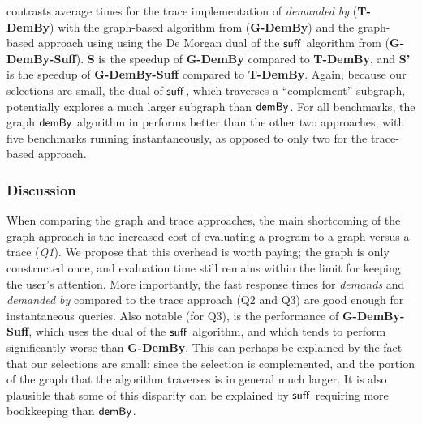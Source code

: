  contrasts average times for the trace implementation of \textit{demanded by}
(\textbf{T-DemBy}) with the graph-based algorithm from 
(\textbf{G-DemBy}) and the graph-based approach using using the De Morgan dual of the $\mathrel{\textup{\textsf{suff}}_{}}$
algorithm from  (\textbf{G-DemBy-Suff}). \textbf{S} is the speedup of
\textbf{G-DemBy} compared to \textbf{T-DemBy}, and \textbf{S'} is the speedup of \textbf{G-DemBy-Suff}
compared to \textbf{T-DemBy}. Again, because our selections are small, the dual of $\mathrel{\textup{\textsf{suff}}_{}}$, which
traverses a ``complement'' subgraph, potentially explores a much larger subgraph than $\mathrel{\textup{\textsf{demBy}}_{}}$. For
all benchmarks, the graph $\mathrel{\textup{\textsf{demBy}}_{}}$ algorithm in  performs
better than the other two approaches, with five benchmarks running instantaneously, as opposed to only two for
the trace-based approach.

{\small}

\subsubsection{Discussion}

When comparing the graph and trace approaches, the main shortcoming of the graph approach is the increased
cost of evaluating a program to a graph versus a trace (\textit{Q1}). We propose that this overhead is worth
paying; the graph is only constructed once, and evaluation time still remains within the limit for keeping the
user's attention. More importantly, the fast response times for \textit{demands} and \textit{demanded by}
compared to the trace approach (Q2 and Q3) are good enough for instantaneous queries. Also notable (for Q3),
is the performance of \textbf{G-DemBy-Suff}, which uses the dual of the $\mathrel{\textup{\textsf{suff}}_{}}$ algorithm, and which
tends to perform significantly worse than \textbf{G-DemBy}. This can perhaps be explained by the fact that our
selections are small: since the selection is complemented, and the portion of the graph that the algorithm
traverses is in general much larger. It is also plausible that some of this disparity can be explained by
$\mathrel{\textup{\textsf{suff}}_{}}$ requiring more bookkeeping than $\mathrel{\textup{\textsf{demBy}}_{}}$.
